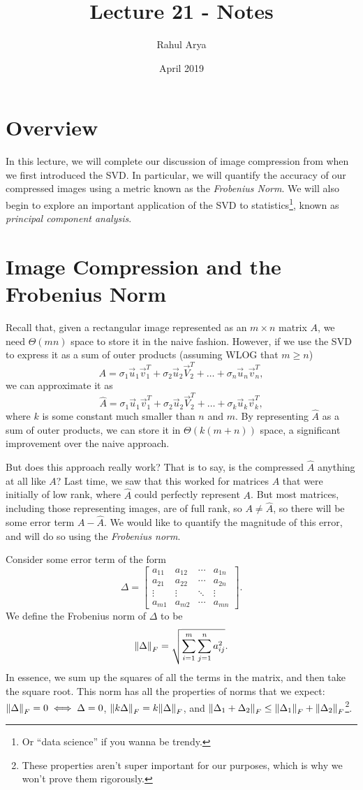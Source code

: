 \documentclass[letterpaper]{article}
\title{Lecture 21 - Notes}
\author{Rahul Arya}
\date{April 2019}
\theoremstyle{remark}
\newcommand{\mat}[1]{\ensuremath{\begin{bmatrix}#1\end{bmatrix}}}
\begin{document}
\maketitle

\section{Overview}
In this lecture, we will complete our discussion of image compression from when we first introduced the SVD. In particular, we will quantify the accuracy of our compressed images using a metric known as the \emph{Frobenius Norm}. We will also begin to explore an important application of the SVD to statistics\footnote{Or ``data science'' if you wanna be trendy.}, known as \emph{principal component analysis}.

\section{Image Compression and the Frobenius Norm}
Recall that, given a rectangular image represented as an $m\times n$ matrix $A$, we need $\Theta(mn)$ space to store it in the naive fashion. However, if we use the SVD to express it as a sum of outer products (assuming WLOG that $m \ge n$)
\[
    A = \sigma_1 \vec{u}_1\vec{v}_1^T + \sigma_2 \vec{u}_2\vec{V}_2^T + \ldots + \sigma_n \vec{u}_n\vec{v}_n^T,
\]
we can approximate it as
\[
    \hat{A} = \sigma_1 \vec{u}_1\vec{v}_1^T + \sigma_2 \vec{u}_2\vec{V}_2^T + \ldots + \sigma_k \vec{u}_k\vec{v}_k^T,
\]
where $k$ is some constant much smaller than $n$ and $m$. By representing $\hat{A}$ as a sum of outer products, we can store it in $\Theta(k(m + n))$ space, a significant improvement over the naive approach.

But does this approach really work? That is to say, is the compressed $\hat{A}$ anything at all like $A$? Last time, we saw that this worked for matrices $A$ that were initially of low rank, where $\hat{A}$ could perfectly represent $A$. But most matrices, including those representing images, are of full rank, so $A \ne \hat{A}$, so there will be some error term $A - \hat{A}$. We would like to quantify the magnitude of this error, and will do so using the \emph{Frobenius norm}.

Consider some error term of the form
\[
    \Delta = \mat{a_{11} & a_{12} & \cdots & a_{1n} \\ a_{21} & a_{22} & \cdots & a_{2n} \\ \vdots & \vdots & \ddots & \vdots \\ a_{m1} & a_{m2} & \cdots & a_{mn}}.
\]
We define the Frobenius norm of $\Delta$ to be
\[
    \norm{\Delta}_F = \sqrt{\sum_{i=1}^m\sum_{j=1}^n a_{ij}^2}.
\]
In essence, we sum up the squares of all the terms in the matrix, and then take the square root. This norm has all the properties of norms that we expect: $\norm{\Delta}_F = 0 \iff \Delta = 0$, $\norm{k\Delta}_F = k\norm{\Delta}_F$, and $\norm{\Delta_1 + \Delta_2}_F \le \norm{\Delta_1}_F + \norm{\Delta_2}_F$\footnote{These properties aren't super important for our purposes, which is why we won't prove them rigorously.}.
\end{document}
